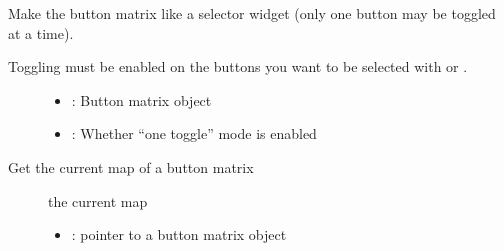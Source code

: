 \documentclass[letterpaper,10pt,english]{sphinxmanual}
\begin{document}
\begin{fulllineitems}
\label{\detokenize{object-types/btnm:_CPPv422lv_btnm_set_one_toggleP8lv_obj_tb}}%
\pysigstartmultiline
{}\label{\detokenize{object-types/btnm:lv__btnm_8h_1ad875619d4dea16a320da0abeb86f799e}}%
\pysigstopmultiline
Make the button matrix like a selector widget (only one button may be toggled at a time).

Toggling must be enabled on the buttons you want to be selected with  or .

\begin{description}
\item[{}] \leavevmode\begin{itemize}
\item {} 
: Button matrix object 

\item {} 
: Whether “one toggle” mode is enabled 

\end{itemize}

\end{description}


\end{fulllineitems}


\begin{fulllineitems}
\label{\detokenize{object-types/btnm:_CPPv421lv_btnm_get_map_arrayPK8lv_obj_t}}%
\pysigstartmultiline
{}\label{\detokenize{object-types/btnm:lv__btnm_8h_1a42b8bfe716e787afa46fd89ca7bacd89}}%
\pysigstopmultiline
Get the current map of a button matrix \begin{description}
\item[{}] \leavevmode
the current map 

\item[{}] \leavevmode\begin{itemize}
\item {} 
: pointer to a button matrix object 

\end{itemize}

\end{description}


\end{fulllineitems}
\end{document}
